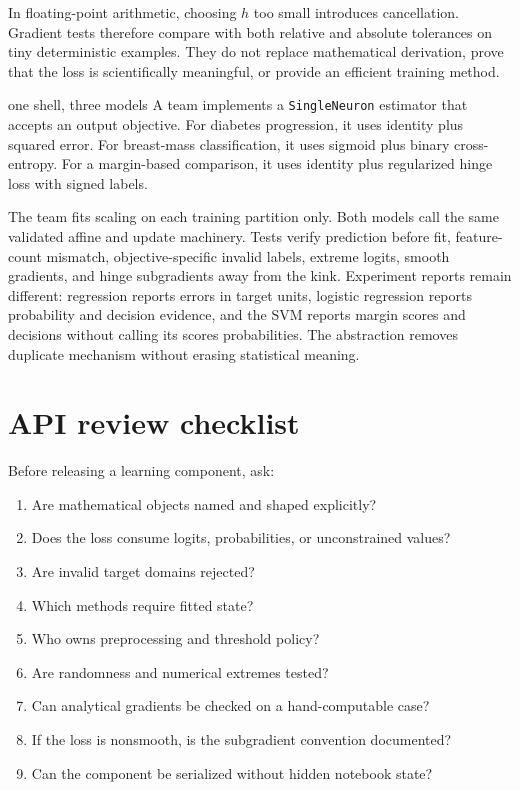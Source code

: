 In floating-point arithmetic, choosing $h$ too small introduces cancellation.
Gradient tests therefore compare with both relative and absolute tolerances on
tiny deterministic examples. They do not replace mathematical derivation,
prove that the loss is scientifically meaningful, or provide an efficient
training method.

\begin{workedexample}{one shell, three models}
A team implements a \texttt{SingleNeuron} estimator that accepts an output
objective. For diabetes progression, it uses identity plus squared error. For
breast-mass classification, it uses sigmoid plus binary cross-entropy.
For a margin-based comparison, it uses identity plus regularized hinge loss
with signed labels.

The team fits scaling on each training partition only. Both models call the
same validated affine and update machinery. Tests verify prediction before fit,
feature-count mismatch, objective-specific invalid labels, extreme logits,
smooth gradients, and hinge subgradients away from the kink. Experiment reports
remain different: regression reports errors in target units, logistic
regression reports probability and decision evidence, and the SVM reports
margin scores and decisions without calling its scores probabilities. The
abstraction removes duplicate mechanism without erasing statistical meaning.
\end{workedexample}

\section{API review checklist}

Before releasing a learning component, ask:
\begin{enumerate}
  \item Are mathematical objects named and shaped explicitly?
  \item Does the loss consume logits, probabilities, or unconstrained values?
  \item Are invalid target domains rejected?
  \item Which methods require fitted state?
  \item Who owns preprocessing and threshold policy?
  \item Are randomness and numerical extremes tested?
  \item Can analytical gradients be checked on a hand-computable case?
  \item If the loss is nonsmooth, is the subgradient convention documented?
  \item Can the component be serialized without hidden notebook state?
\end{enumerate}

